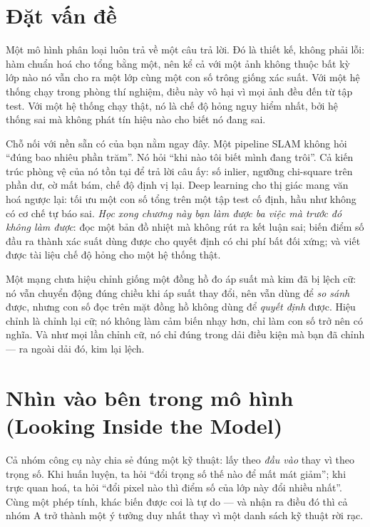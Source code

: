 \documentclass[../../deep_learning.tex]{subfiles}
\begin{document}
\section{Đặt vấn đề}
Một mô hình phân loại luôn trả về một câu trả lời. Đó là thiết kế, không phải lỗi: hàm  chuẩn hoá cho tổng bằng một, nên kể cả với một ảnh không thuộc bất kỳ lớp nào nó vẫn cho ra một lớp cùng một con số trông giống xác suất. Với một hệ thống chạy trong phòng thí nghiệm, điều này vô hại vì mọi ảnh đều đến từ tập test. Với một hệ thống chạy thật, nó là chế độ hỏng nguy hiểm nhất, bởi hệ thống sai mà không phát tín hiệu nào cho biết nó đang sai.

Chỗ nối với nền sẵn có của bạn nằm ngay đây. Một pipeline SLAM không hỏi ``đúng bao nhiêu phần trăm''. Nó hỏi ``khi nào tôi biết mình đang trôi''. Cả kiến trúc phòng vệ của nó tồn tại để trả lời câu ấy: số inlier, ngưỡng chi-square trên phần dư, cờ mất bám, chế độ định vị lại. Deep learning cho thị giác mang văn hoá ngược lại: tối ưu một con số tổng trên một tập test cố định, hầu như không có cơ chế tự báo sai. \emph{Học xong chương này bạn làm được ba việc mà trước đó không làm được}: đọc một bản đồ nhiệt mà không rút ra kết luận sai; biến điểm số đầu ra thành xác suất dùng được cho quyết định có chi phí bất đối xứng; và viết được tài liệu chế độ hỏng cho một hệ thống thật.

\begin{trucgiac}
Một mạng chưa hiệu chỉnh giống một đồng hồ đo áp suất mà kim đã bị lệch cữ: nó vẫn chuyển động đúng chiều khi áp suất thay đổi, nên vẫn dùng để \emph{so sánh} được, nhưng con số đọc trên mặt đồng hồ không dùng để \emph{quyết định} được. Hiệu chỉnh là chỉnh lại cữ; nó không làm cảm biến nhạy hơn, chỉ làm con số trở nên có nghĩa. Và như mọi lần chỉnh cữ, nó chỉ đúng trong dải điều kiện mà bạn đã chỉnh --- ra ngoài dải đó, kim lại lệch.
\end{trucgiac}

\section{Nhìn vào bên trong mô hình (Looking Inside the Model)}
Cả nhóm công cụ này chia sẻ đúng một kỹ thuật: lấy  theo \emph{đầu vào} thay vì theo trọng số. Khi huấn luyện, ta hỏi ``đổi trọng số thế nào để mất mát giảm''; khi trực quan hoá, ta hỏi ``đổi pixel nào thì điểm số của lớp này đổi nhiều nhất''. Cùng một phép tính, khác biến được coi là tự do --- và nhận ra điều đó thì cả nhóm A trở thành một ý tưởng duy nhất thay vì một danh sách kỹ thuật rời rạc.
\end{document}

